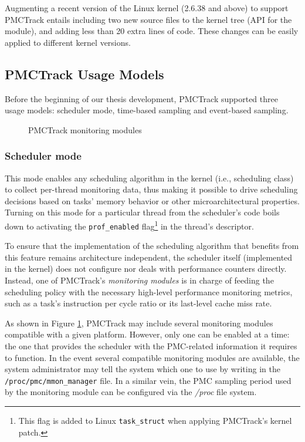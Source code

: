 Augmenting a recent version of the Linux kernel (2.6.38 and above) to support PMCTrack entails including two new source files to the kernel tree (API for the module), and adding less than 20 extra lines of code. These changes can be easily applied to different kernel versions.

\subsection{PMCTrack Usage Models}\label{pmctrack-usage-models}

Before the beginning of our thesis development, PMCTrack supported three
usage models: scheduler mode, time-based sampling and event-based
sampling.

\begin{figure}[tbp!]
\centering
{}

\caption{PMCTrack monitoring modules}
\label{fig:mmon}
\end{figure}

\subsubsection{Scheduler mode}\label{scheduler-mode}

This mode enables any scheduling algorithm in the kernel (i.e.,
scheduling class) to collect per-thread monitoring data, thus making it
possible to drive scheduling decisions based on tasks' memory behavior
or other microarchitectural properties. Turning on this mode for a
particular thread from the scheduler's code boils down to activating the
\texttt{prof\_enabled}
flag\footnote{This flag is added to Linux \texttt{task\_struct} when applying PMCTrack's kernel patch.}
in the thread's descriptor.

To ensure that the implementation of the scheduling algorithm that
benefits from this feature remains architecture independent, the
scheduler itself (implemented in the kernel) does not configure nor
deals with performance counters directly. Instead, one of PMCTrack's
\textit{monitoring modules} is in charge of feeding the scheduling
policy with the necessary high-level performance monitoring metrics,
such as a task's instruction per cycle ratio or its last-level cache
miss rate.

As shown in Figure \ref{fig:mmon}, PMCTrack may include several
monitoring modules compatible with a given platform. However, only one
can be enabled at a time: the one that provides the scheduler with the
PMC-related information it requires to function. In the event several
compatible monitoring modules are available, the system administrator
may tell the system which one to use by writing in the
\texttt{/proc/pmc/mmon\_manager} file. In a similar vein, the PMC
sampling period used by the monitoring module can be configured via the
\emph{/proc} file system.


